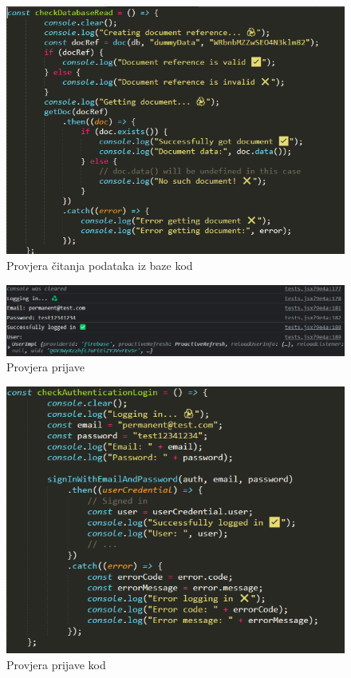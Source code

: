             \begin{figure}[H]
			\includegraphics[scale=0.8]{slike/citanje baze kod.png}
			\centering
			\caption{Provjera čitanja podataka iz baze kod }
			\label{fig:promjene}
		          \end{figure}

            \begin{figure}[H]
			\includegraphics[scale=0.5]{slike/provjera logina.png}
			\centering
			\caption{Provjera prijave }
			\label{fig:promjene}
		          \end{figure}

            \begin{figure}[H]
			\includegraphics[scale=0.8]{slike/provjera logina kod.png}
			\centering
			\caption{Provjera prijave kod}
			\label{fig:promjene}
		          \end{figure}

